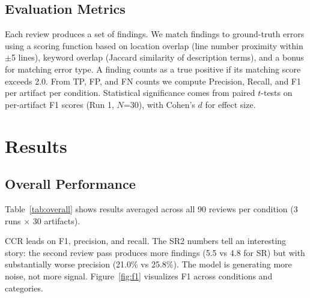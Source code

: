 \documentclass[11pt]{article}
\begin{document}
\subsection{Evaluation Metrics}

Each review produces a set of findings. We match findings to ground-truth errors using a scoring function based on location overlap (line number proximity within $\pm$5 lines), keyword overlap (Jaccard similarity of description terms), and a bonus for matching error type. A finding counts as a true positive if its matching score exceeds 2.0. From TP, FP, and FN counts we compute Precision, Recall, and F1 per artifact per condition. Statistical significance comes from paired $t$-tests on per-artifact F1 scores (Run 1, $N$=30), with Cohen's $d$ for effect size.

\section{Results}

\subsection{Overall Performance}

Table~\ref{tab:overall} shows results averaged across all 90 reviews per condition (3 runs $\times$ 30 artifacts).

\begin{table}[h]
\centering
\small
{}
\caption{Overall results ($N$=90 per condition). Finds/TP/FP/FN are per-artifact averages; Prec./Rec./F1 in \%.}
\label{tab:overall}
\end{table}

CCR leads on F1, precision, and recall. The SR2 numbers tell an interesting story: the second review pass produces more findings (5.5 vs 4.8 for SR) but with substantially worse precision (21.0\% vs 25.8\%). The model is generating more noise, not more signal. Figure~\ref{fig:f1} visualizes F1 across conditions and categories.
\end{document}

